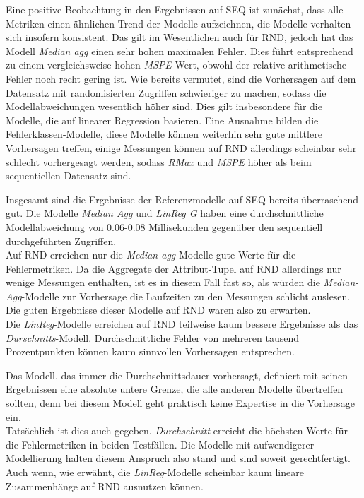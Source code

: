\documentclass[
	12pt,
	a4paper,
	BCOR10mm,
	DIV14,
	listof=totoc,
	bibliography=totoc,
	headsepline
]{scrreprt}
\begin{document}
Eine positive Beobachtung in den Ergebnissen auf SEQ ist zunächst, dass alle Metriken einen ähnlichen Trend der  Modelle aufzeichnen, die Modelle verhalten sich insofern konsistent.
Das gilt im Wesentlichen auch für RND, jedoch hat das Modell \textit{Median agg} einen sehr hohen maximalen Fehler. Dies führt entsprechend zu einem vergleichsweise hohen \textit{MSPE}-Wert, obwohl der relative arithmetische Fehler noch recht gering ist.
Wie bereits vermutet, sind die Vorhersagen auf dem Datensatz mit randomisierten Zugriffen schwieriger zu machen, sodass die Modellabweichungen wesentlich höher sind.
Dies gilt insbesondere für die Modelle, die auf linearer Regression basieren.
Eine Ausnahme bilden die Fehlerklassen-Modelle, diese Modelle können weiterhin sehr gute mittlere Vorhersagen treffen, einige Messungen können auf RND allerdings scheinbar sehr schlecht vorhergesagt werden, sodass \textit{RMax} und \textit{MSPE} höher als beim sequentiellen Datensatz sind.\medskip

Insgesamt sind die Ergebnisse der Referenzmodelle auf SEQ bereits überraschend gut.
Die Modelle \textit{Median Agg} und \textit{LinReg G} haben eine durchschnittliche Modellabweichung von 0.06-0.08 Millisekunden gegenüber den sequentiell durchgeführten Zugriffen.\\
Auf RND erreichen nur die \textit{Median agg}-Modelle gute Werte für die Fehlermetriken.
Da die Aggregate der Attribut-Tupel auf RND allerdings nur wenige Messungen enthalten, ist es in diesem Fall fast so, als würden die \textit{Median-Agg}-Modelle zur Vorhersage die Laufzeiten zu den Messungen schlicht auslesen. Die guten Ergebnisse dieser Modelle auf RND waren also zu erwarten.\\
Die \textit{LinReg}-Modelle erreichen auf RND teilweise kaum bessere Ergebnisse als das \textit{Durschnitts}-Modell.
Durchschnittliche Fehler von mehreren tausend Prozentpunkten können kaum sinnvollen Vorhersagen entsprechen. \medskip

Das Modell, das immer die Durchschnittsdauer vorhersagt, definiert mit seinen Ergebnissen eine absolute untere Grenze, die alle anderen Modelle übertreffen sollten, denn bei diesem Modell geht praktisch keine Expertise in die Vorhersage ein.\\ 
Tatsächlich ist dies auch gegeben. \textit{Durchschnitt} erreicht die höchsten Werte für die Fehlermetriken in beiden Testfällen.
Die Modelle mit aufwendigerer Modellierung halten diesem Anspruch also stand und sind soweit gerechtfertigt. Auch wenn, wie erwähnt, die \textit{LinReg}-Modelle scheinbar kaum lineare Zusammenhänge auf RND ausnutzen können.\medskip
\end{document}
